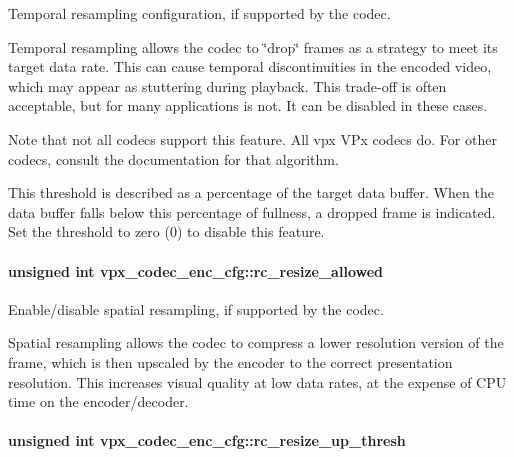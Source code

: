 Temporal resampling configuration, if supported by the codec. 

Temporal resampling allows the codec to \char`\"{}drop\char`\"{} frames as a strategy to meet its target data rate. This can cause temporal discontinuities in the encoded video, which may appear as stuttering during playback. This trade-\/off is often acceptable, but for many applications is not. It can be disabled in these cases.

Note that not all codecs support this feature. All vpx V\+Px codecs do. For other codecs, consult the documentation for that algorithm.

This threshold is described as a percentage of the target data buffer. When the data buffer falls below this percentage of fullness, a dropped frame is indicated. Set the threshold to zero (0) to disable this feature. \hypertarget{structvpx__codec__enc__cfg_a02a4e2f18fb0fdfff44df8b0d9a99d6c}{
\paragraph[{rc\+\_\+resize\+\_\+allowed}]{\setlength{\rightskip}{0pt plus 5cm}unsigned int vpx\+\_\+codec\+\_\+enc\+\_\+cfg\+::rc\+\_\+resize\+\_\+allowed}}\label{structvpx__codec__enc__cfg_a02a4e2f18fb0fdfff44df8b0d9a99d6c}


Enable/disable spatial resampling, if supported by the codec. 

Spatial resampling allows the codec to compress a lower resolution version of the frame, which is then upscaled by the encoder to the correct presentation resolution. This increases visual quality at low data rates, at the expense of C\+P\+U time on the encoder/decoder. \hypertarget{structvpx__codec__enc__cfg_a855599c0660f31dfcab4a64996b4f6ad}{
\paragraph[{rc\+\_\+resize\+\_\+up\+\_\+thresh}]{\setlength{\rightskip}{0pt plus 5cm}unsigned int vpx\+\_\+codec\+\_\+enc\+\_\+cfg\+::rc\+\_\+resize\+\_\+up\+\_\+thresh}}\label{structvpx__codec__enc__cfg_a855599c0660f31dfcab4a64996b4f6ad}


